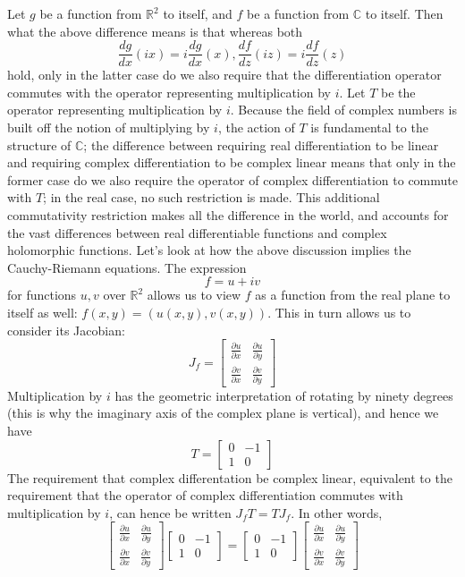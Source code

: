 \documentclass{article}
\newcommand*{\n}{\newline}
\newcommand*{\R}{\mathbb{R}}
\newcommand*{\C}{\mathbb{C}}
\begin{document}
\n
Let $ g $ be a function from $ \R^2 $ to itself, and $ f $ be a function from $ \C $ to itself. Then what the above difference means is that whereas both
$$ \frac{dg}{dx}(ix) = i \frac{dg}{dx}(x), \frac{df}{dz}(iz) = i \frac{df}{dz}(z) $$
hold, only in the latter case do we also require that the differentiation operator commutes with the operator representing multiplication by $ i $. Let $ T $ be the operator representing multiplication by $ i $. Because the field of complex numbers is built off the notion of multiplying by $ i $, the action of $ T $ is fundamental to the structure of $ \C $; the difference between requiring real differentiation to be linear and requiring complex differentiation to be complex linear means that only in the former case do we also require the operator of complex differentiation to commute with $ T $; in the real case, no such restriction is made. This additional commutativity restriction makes all the difference in the world, and accounts for the vast differences between real differentiable functions and complex holomorphic functions.
\n
Let's look at how the above discussion implies the Cauchy-Riemann equations. The expression
$$ f = u + i v $$
for functions $ u, v $ over $ \R^2 $ allows us to view $ f $ as a function from the real plane to itself as well: $ f(x, y) = (u(x, y), v(x, y)) $. This in turn allows us to consider its Jacobian:
$$ J_f = \begin{bmatrix}
    \frac{\partial u}{\partial x} & \frac{\partial u}{\partial y} \\
    \frac{\partial v}{\partial x} & \frac{\partial v}{\partial y}
\end{bmatrix} $$
Multiplication by $ i $ has the geometric interpretation of rotating by ninety degrees (this is why the imaginary axis of the complex plane is vertical), and hence we have
$$ T = \begin{bmatrix}
    0 & -1 \\
    1 & 0
\end{bmatrix} $$
The requirement that complex differentation be complex linear, equivalent to the requirement that the operator of complex differentiation commutes with multiplication by $ i $, can hence be written $ J_f T = T J_f $. In other words,
$$ \begin{bmatrix}
    \frac{\partial u}{\partial x} & \frac{\partial u}{\partial y} \\
    \frac{\partial v}{\partial x} & \frac{\partial v}{\partial y}
\end{bmatrix} \begin{bmatrix}
    0 & -1 \\
    1 & 0
\end{bmatrix} = \begin{bmatrix}
    0 & -1 \\
    1 & 0
\end{bmatrix} \begin{bmatrix}
    \frac{\partial u}{\partial x} & \frac{\partial u}{\partial y} \\
    \frac{\partial v}{\partial x} & \frac{\partial v}{\partial y}
\end{bmatrix} $$
\end{document}
